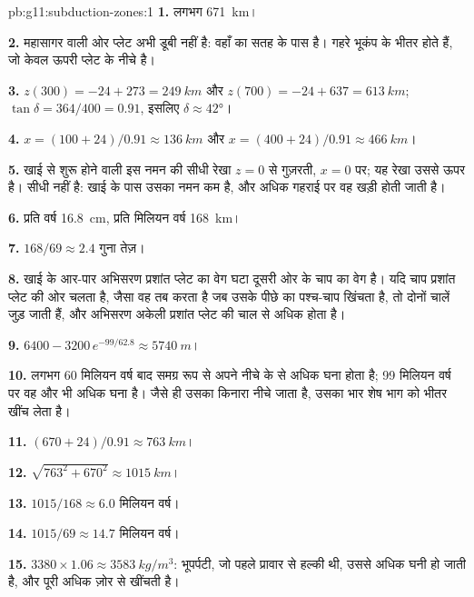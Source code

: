 \begin{solution}{pb:g11:subduction-zones:1}
\textbf{1.} लगभग \qty{671}{km}।

\textbf{2.} महासागर वाली ओर प्लेट अभी डूबी नहीं है: वहाँ का 
सतह के पास है। गहरे भूकंप  के भीतर होते हैं, जो
केवल ऊपरी प्लेट के नीचे है।

\textbf{3.} $z(300) = -24 + 273 = \qty{249}{km}$ और
$z(700) = -24 + 637 = \qty{613}{km}$; $\tan\delta = 364/400 = 0.91$, इसलिए
$\delta \approx \ang{42}$।

\textbf{4.} $x = (100 + 24)/0.91 \approx \qty{136}{km}$ और
$x = (400 + 24)/0.91 \approx \qty{466}{km}$।

\textbf{5.} खाई से शुरू होने वाली इस नमन की सीधी रेखा $z = 0$ से
गुज़रती, $x = 0$ पर; यह रेखा उससे ऊपर है।  सीधी नहीं है: खाई के पास
उसका नमन कम है, और अधिक गहराई पर वह खड़ी होती जाती है।

\textbf{6.} प्रति वर्ष \qty{16.8}{cm}, प्रति मिलियन वर्ष \qty{168}{km}।

\textbf{7.} $168/69 \approx 2.4$ गुना तेज़।

\textbf{8.} खाई के आर-पार अभिसरण प्रशांत प्लेट का वेग घटा दूसरी ओर के
चाप का वेग है। यदि चाप प्रशांत प्लेट की ओर चलता है, जैसा वह तब करता है
जब उसके पीछे का पश्च-चाप खिंचता है, तो दोनों चालें जुड़ जाती हैं, और अभिसरण
अकेली प्रशांत प्लेट की चाल से अधिक होता है।

\textbf{9.} $6400 - 3200\,e^{-99/62.8} \approx \qty{5740}{m}$।

\textbf{10.} लगभग 60 मिलियन वर्ष बाद  समग्र रूप से अपने नीचे
के  से अधिक घना होता है; 99 मिलियन वर्ष पर वह और भी अधिक घना
है। जैसे ही उसका किनारा नीचे जाता है, उसका भार शेष भाग को भीतर खींच लेता है।

\textbf{11.} $(670 + 24)/0.91 \approx \qty{763}{km}$।

\textbf{12.} $\sqrt{763^2 + 670^2} \approx \qty{1015}{km}$।

\textbf{13.} $1015/168 \approx 6.0$ मिलियन वर्ष।

\textbf{14.} $1015/69 \approx 14.7$ मिलियन वर्ष।

\textbf{15.} $3380 \times 1.06 \approx \qty{3583}{kg/m^3}$: भूपर्पटी, जो पहले
प्रावार से हल्की थी, उससे अधिक घनी हो जाती है, और पूरी  अधिक ज़ोर से
खींचती है।


\end{solution}
